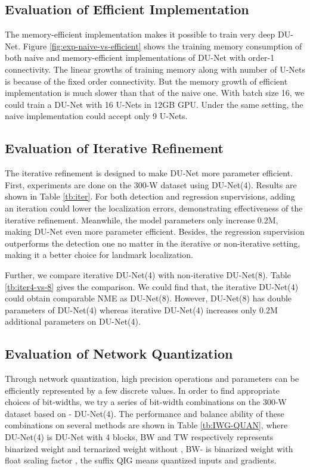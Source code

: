 \documentclass[runningheads]{llncs}
\begin{document}
\subsection{Evaluation of Efficient Implementation}

The memory-efficient implementation makes it possible to train very deep DU-Net. Figure \ref{fig:exp-naive-vs-efficient} shows the training memory consumption of both naive and memory-efficient implementations of DU-Net with order-1 connectivity. The linear growths of training memory along with number of U-Nets is because of the fixed order connectivity. But the memory growth of efficient implementation is much slower than that of the naive one. With batch size 16, we could train a DU-Net with 16 U-Nets in 12GB GPU. Under the same setting, the naive implementation could accept only 9 U-Nets.


\subsection{Evaluation of Iterative Refinement}
The iterative refinement is designed to make DU-Net more parameter efficient. First, experiments are done on the 300-W dataset using DU-Net(4). Results are shown in Table \ref{tb:iter}. For both detection and regression supervisions, adding an iteration could lower the localization errors, demonstrating effectiveness of the iterative refinement. Meanwhile, the model parameters only increase 0.2M, making DU-Net even more parameter efficient. Besides, the regression supervision outperforms the detection one no matter in the iterative or non-iterative setting, making it a better choice for landmark localization. 


Further, we compare iterative DU-Net(4) with non-iterative DU-Net(8). Table \ref{tb:iter4-vs-8} gives the comparison. We could find that, the iterative DU-Net(4) could obtain comparable NME as DU-Net(8). However, DU-Net(8) has double parameters of  DU-Net(4) whereas iterative DU-Net(4) increases only 0.2M additional parameters on DU-Net(4).


\subsection{Evaluation of Network Quantization}

Through network quantization, high precision operations and parameters can be efficiently represented by a few discrete values. 
In order to find appropriate choices of bit-widths, we try a series of bit-width combinations on the 300-W dataset based on - DU-Net(4). The performance and balance ability of these combinations on several methods are shown in Table \ref{tb:IWG-QUAN}, where DU-Net(4) is DU-Net with 4 blocks, BW and TW respectively represents binarized weight and ternarized weight without , BW- is binarized weight with float scaling factor , the suffix QIG means quantized inputs and gradients. 
\end{document}
